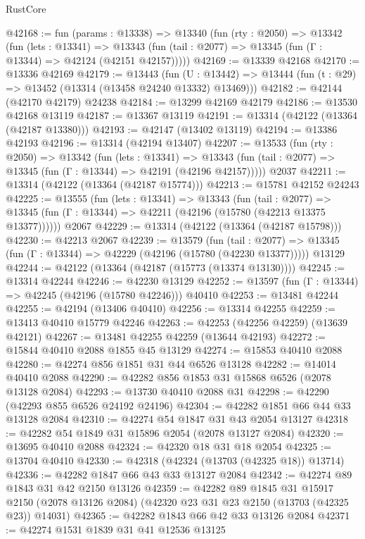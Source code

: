 \begin{lexlean}{RustCore}
\begin{coremodule}
@42168 := fun (params : @13338) =>
  @13340
    (fun (rty : @2050) =>
    @13342
      (fun (lets : @13341) =>
      @13343 (fun (tail : @2077) => @13345 (fun (Γ : @13344) => @42124 (@42151 @42157)))))
@42169 := @13339 @42168
@42170 := @13336 @42169
@42179 := @13443
    (fun (U : @13442) => @13444 (fun (t : @29) => @13452 (@13314 (@13458 @24240 @13332) @13469)))
@42182 := @42144 (@42170 @42179) @24238
@42184 := @13299 @42169 @42179
@42186 := @13530 @42168 @13119
@42187 := @13367 @13119
@42191 := @13314 (@42122 (@13364 (@42187 @13380)))
@42193 := @42147 (@13402 @13119)
@42194 := @13386 @42193
@42196 := @13314 (@42194 @13407)
@42207 := @13533
    (fun (rty : @2050) =>
    @13342
      (fun (lets : @13341) =>
      @13343 (fun (tail : @2077) => @13345 (fun (Γ : @13344) => @42191 (@42196 @42157)))))
    @2037
@42211 := @13314 (@42122 (@13364 (@42187 @15774)))
@42213 := @15781 @42152 @24243
@42225 := @13555
    (fun (lets : @13341) =>
    @13343
      (fun (tail : @2077) =>
      @13345 (fun (Γ : @13344) => @42211 (@42196 (@15780 (@42213 @13375 @13377))))))
    @2067
@42229 := @13314 (@42122 (@13364 (@42187 @15798)))
@42230 := @42213 @2067
@42239 := @13579
    (fun (tail : @2077) => @13345 (fun (Γ : @13344) => @42229 (@42196 (@15780 (@42230 @13377)))))
    @13129
@42244 := @42122 (@13364 (@42187 (@15773 (@13374 @13130))))
@42245 := @13314 @42244
@42246 := @42230 @13129
@42252 := @13597 (fun (Γ : @13344) => @42245 (@42196 (@15780 @42246))) @40410
@42253 := @13481 @42244
@42255 := @42194 (@13406 @40410)
@42256 := @13314 @42255
@42259 := @13413 @40410 @15779 @42246
@42263 := @42253 (@42256 @42259) (@13639 @42121)
@42267 := @13481 @42255 @42259 (@13644 @42193)
@42272 := @15844 @40410 @2088 @1855 @45 @13129
@42274 := @15853 @40410 @2088
@42280 := @42274 @856 @1851 @31 @44 @6526 @13128
@42282 := @14014 @40410 @2088
@42290 := @42282 @856 @1853 @31 @15868 @6526 (@2078 @13128 @2084)
@42293 := @13730 @40410 @2088 @31
@42298 := @42290 (@42293 @855 @6526 @24192 @24196)
@42304 := @42282 @1851 @66 @44 @33 @13128 @2084
@42310 := @42274 @54 @1847 @31 @43 @2054 @13127
@42318 := @42282 @54 @1849 @31 @15896 @2054 (@2078 @13127 @2084)
@42320 := @13695 @40410 @2088
@42324 := @42320 @18 @31 @18 @2054
@42325 := @13704 @40410
@42330 := @42318 (@42324 (@13703 (@42325 @18)) @13714)
@42336 := @42282 @1847 @66 @43 @33 @13127 @2084
@42342 := @42274 @89 @1843 @31 @42 @2150 @13126
@42359 := @42282
    @89
    @1845
    @31
    @15917
    @2150
    (@2078 @13126 @2084)
    (@42320 @23 @31 @23 @2150 (@13703 (@42325 @23)) @14031)
@42365 := @42282 @1843 @66 @42 @33 @13126 @2084
@42371 := @42274 @1531 @1839 @31 @41 @12536 @13125

\end{coremodule}
\end{lexlean}
